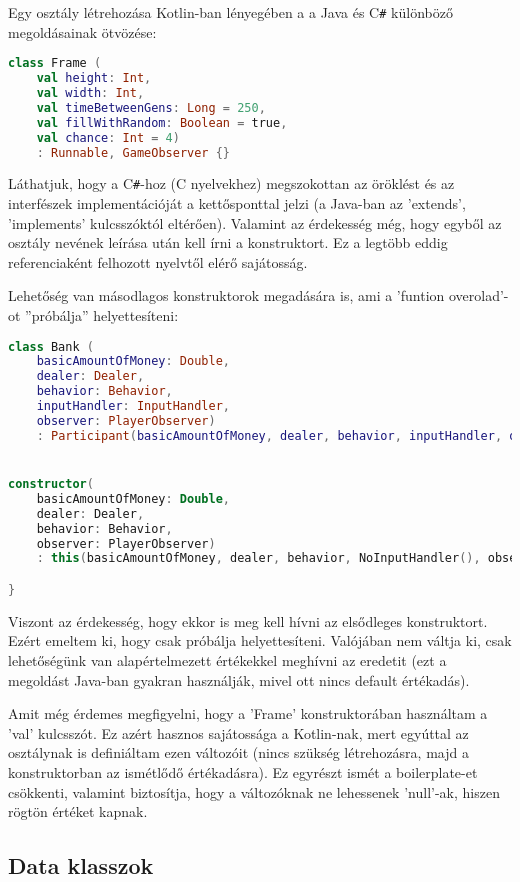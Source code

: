 Egy osztály létrehozása Kotlin-ban lényegében a a Java és C\verb|#| különböző megoldásainak ötvözése:
\scriptsize
\begin{lstlisting}[language = Kotlin]
class Frame (
	val height: Int,
	val width: Int,
	val timeBetweenGens: Long = 250,
	val fillWithRandom: Boolean = true,
	val chance: Int = 4) 
	: Runnable, GameObserver {}
\end{lstlisting}
\normalsize
Láthatjuk, hogy a C\verb|#|-hoz (C nyelvekhez) megszokottan az öröklést és az interfészek implementációját a kettősponttal jelzi (a Java-ban az 'extends', 'implements' kulcsszóktól eltérően). Valamint az érdekesség még, hogy egyből az osztály nevének leírása után kell írni a konstruktort. Ez a legtöbb eddig referenciaként felhozott nyelvtől elérő sajátosság. 

Lehetőség van másodlagos konstruktorok megadására is, ami a 'funtion overolad'-ot ''próbálja'' helyettesíteni:
\scriptsize
\begin{lstlisting}[language = Kotlin]
class Bank (
	basicAmountOfMoney: Double,
	dealer: Dealer,
	behavior: Behavior,
	inputHandler: InputHandler,
	observer: PlayerObserver)
	: Participant(basicAmountOfMoney, dealer, behavior, inputHandler, observer){


constructor( 
	basicAmountOfMoney: Double,
	dealer: Dealer,
	behavior: Behavior,
	observer: PlayerObserver)
	: this(basicAmountOfMoney, dealer, behavior, NoInputHandler(), observer)

}
\end{lstlisting}
\normalsize
Viszont az érdekesség, hogy ekkor is meg kell hívni az elsődleges konstruktort. Ezért emeltem ki, hogy csak próbálja helyettesíteni. Valójában nem váltja ki, csak lehetőségünk van alapértelmezett értékekkel meghívni az eredetit (ezt a megoldást Java-ban gyakran használják, mivel ott nincs default értékadás).

Amit még érdemes megfigyelni, hogy a 'Frame' konstruktorában használtam a 'val' kulcsszót. Ez azért hasznos sajátossága a Kotlin-nak, mert egyúttal az osztálynak is definiáltam ezen változóit (nincs szükség létrehozásra, majd a konstruktorban az ismétlődő értékadásra). Ez egyrészt ismét a boilerplate-et csökkenti, valamint biztosítja, hogy a változóknak ne lehessenek 'null'-ak, hiszen rögtön értéket kapnak. 

\subsection{Data klasszok}
\label{subsec:k_dataC}


